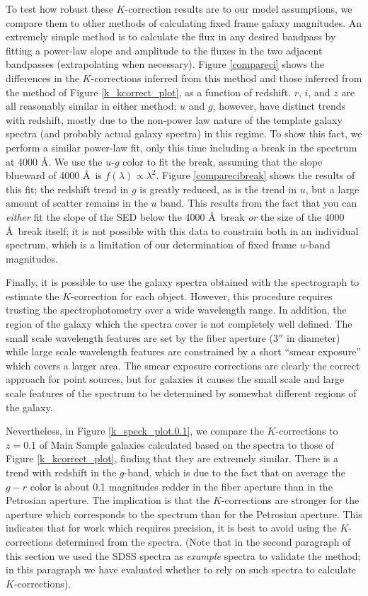 \documentclass[10pt,preprint]{aastex}
\begin{document}
To test how robust these $K$-correction results are to our model
assumptions, we compare them to other methods of calculating fixed
frame galaxy magnitudes.  An extremely simple method is to calculate
the flux in any desired bandpass by fitting a power-law slope and
amplitude to the fluxes in the two adjacent bandpasses (extrapolating
when necessary). Figure \ref{compareci} shows the differences in
the $K$-corrections inferred from this method and those inferred from
the method of Figure \ref{k_kcorrect_plot}, as a function of
redshift. $r$, $i$, and $z$ are all reasonably similar in either
method; $u$ and $g$, however, have distinct trends with redshift,
mostly due to the non-power law nature of the template galaxy spectra
(and probably actual galaxy spectra) in this regime. To show this
fact, we perform a similar power-law fit, only this time including a
break in the spectrum at 4000 \AA. We use the $u$-$g$ color to fit the
break, assuming that the slope blueward of 4000 \AA\ is
$f(\lambda)\propto \lambda^{2}$.  Figure \ref{comparecibreak} shows
the results of this fit; the redshift trend in $g$ is greatly reduced,
as is the trend in $u$, but a large amount of scatter remains in the
$u$ band. This results from the fact that you can {\it either} fit the
slope of the SED below the 4000 \AA\ break {\it or} the size of the
4000 \AA\ break itself; it is not possible with this data to constrain
both in an individual spectrum, which is a limitation of our
determination of fixed frame $u$-band magnitudes.

Finally, it is possible to use the galaxy spectra obtained with the
spectrograph to estimate the $K$-correction for each object.  However,
this procedure requires trusting the spectrophotometry over a wide
wavelength range. In addition, the region of the galaxy which the
spectra cover is not completely well defined. The small scale
wavelength features are set by the fiber aperture ($3''$ in diameter)
while large scale wavelength features are constrained by a short
``smear exposure'' which covers a larger area. The smear exposure
corrections are clearly the correct approach for point sources, but
for galaxies it causes the small scale and large scale features of the
spectrum to be determined by somewhat different regions of the galaxy.

Nevertheless, in Figure \ref{k_speck_plot.0.1}, we compare the
$K$-corrections to $z=0.1$ of Main Sample galaxies calculated based on
the spectra to those of Figure \ref{k_kcorrect_plot}, finding that
they are extremely similar. There is a trend with redshift in the
$g$-band, which is due to the fact that on average the $g-r$ color is
about 0.1 magnitudes redder in the fiber aperture than in the
Petrosian aperture. The implication is that the $K$-corrections are
stronger for the aperture which corresponds to the spectrum than for
the Petrosian aperture. This indicates that for work which requires
precision, it is best to avoid using the $K$-corrections determined
from the spectra. (Note that in the second paragraph of this section
we used the SDSS spectra as {\it example} spectra to validate the
method; in this paragraph we have evaluated whether to rely on such
spectra to calculate $K$-corrections).
\end{document}
